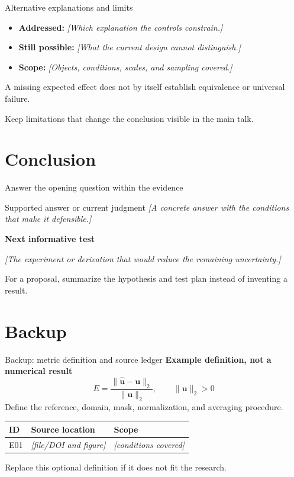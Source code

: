 \documentclass[11pt,aspectratio=169]{beamer}
\newcommand{\evidencesource}[1]{%
  \par\vfill{\fontsize{8}{9.5}\selectfont\color{black!65}#1\par}}
\newcommand{\slot}[1]{\textit{[#1]}}
\begin{document}
\begin{frame}{Alternative explanations and limits}
  \begin{itemize}
    \item \textbf{Addressed:} \slot{Which explanation the controls constrain.}
    \item \textbf{Still possible:} \slot{What the current design cannot distinguish.}
    \item \textbf{Scope:} \slot{Objects, conditions, scales, and sampling covered.}
  \end{itemize}
  \bigskip
  A missing expected effect does not by itself establish equivalence or universal failure.
  \evidencesource{Keep limitations that change the conclusion visible in the main talk.}
\end{frame}

\section{Conclusion}
\begin{frame}{Answer the opening question within the evidence}
  \begin{block}{Supported answer or current judgment}
    \slot{A concrete answer with the conditions that make it defensible.}
  \end{block}
  \medskip
  \textbf{Next informative test}\par
  \slot{The experiment or derivation that would reduce the remaining uncertainty.}
  \evidencesource{For a proposal, summarize the hypothesis and test plan instead of inventing a result.}
\end{frame}

\AtBeginPart{}
\appendix
\section{Backup}
\begin{frame}[label=backup-metric]{Backup: metric definition and source ledger}
  \textbf{Example definition, not a numerical result}
  \[
    E = \frac{\lVert\widehat{\mathbf{u}}-\mathbf{u}\rVert_2}
                  {\lVert\mathbf{u}\rVert_2},
    \qquad \lVert\mathbf{u}\rVert_2 > 0
  \]
  Define the reference, domain, mask, normalization, and averaging procedure.
  \medskip
  \begin{tabular}{@{}lll@{}}
    \toprule
    ID & Source location & Scope \\
    \midrule
    E01 & \slot{file/DOI and figure} & \slot{conditions covered} \\
    \bottomrule
  \end{tabular}
  \medskip\par
  \hyperlink{design}{}
  \evidencesource{Replace this optional definition if it does not fit the research.}
\end{frame}
\end{document}
